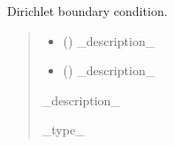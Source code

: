 \documentclass[letterpaper,10pt,english]{sphinxmanual}
\begin{document}
\begin{fulllineitems}
\label{\detokenize{fcdft.jellium:fcdft.jellium.jellium.bc}}
\pysigstartsignatures
\pysiglinewithargsret
{}
{\sphinxparamcomma {}}
{}
\pysigstopsignatures
\sphinxAtStartPar
Dirichlet boundary condition.
\begin{quote}\begin{description}
\begin{itemize}
\item {} 
\sphinxAtStartPar
{} () \textendash{} \_description\_

\item {} 
\sphinxAtStartPar
{} () \textendash{} \_description\_

\end{itemize}

\sphinxAtStartPar
\_description\_

\sphinxAtStartPar
\_type\_

\end{description}\end{quote}

\end{fulllineitems}

\end{document}
